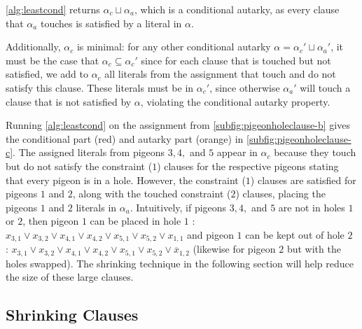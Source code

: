 \autoref{alg:leastcond} returns $\alpha_c \sqcup \alpha_a$, which is a
conditional autarky, as every clause that $\alpha_a$ touches is satisfied by a
literal in $\alpha$.

Additionally, $\alpha_c$ is minimal: for any other conditional autarky $\alpha =
\alpha_c' \sqcup \alpha_a'$, it must be the case that $\alpha_c \subseteq
\alpha_c'$ since for each clause that is touched but not satisfied, we add to
$\alpha_c$ all literals from the assignment that touch and do not satisfy this
clause. These literals must be in $\alpha_c'$, since otherwise $\alpha_a'$ will touch a
clause that is not satisfied by $\alpha$, violating the conditional autarky
property.

Running \autoref{alg:leastcond} on the assignment from
\autoref{subfig:pigeonholeclause-b}  
gives the conditional part (red) and autarky part (orange) in
\autoref{subfig:pigeonholeclause-c}. The assigned literals from pigeons $3,4,$
and $5$ appear in $\alpha_c$ because they touch but do not satisfy the
constraint ($1$) clauses for the respective pigeons stating that every pigeon is
in a hole. However, the constraint ($1$) clauses are satisfied for pigeons $1$
and $2$, along with the touched constraint ($2$) clauses, placing the pigeons
$1$ and $2$ literals in $\alpha_a$. Intuitively, if pigeons $3,4,$ and $5$ are
not in holes $1$ or $2$, then pigeon $1$ can be placed in hole $1$ : $x_{3,1}
\lor x_{3,2} \lor x_{4,1} \lor x_{4,2} \lor x_{5,1} \lor x_{5,2} \lor x_{1,1} $
and pigeon $1$ can be kept out of hole $2$ : $x_{3,1} \lor x_{3,2} \lor x_{4,1}
\lor x_{4,2} \lor x_{5,1} \lor x_{5,2} \lor \overline{x}_{1,2} $ (likewise for
pigeon $2$ but with the holes swapped). 
The shrinking technique in the following section will help reduce the size of
these large \pr clauses. 



\subsection{Shrinking \pr Clauses}~\label{subsec:shrinking}

